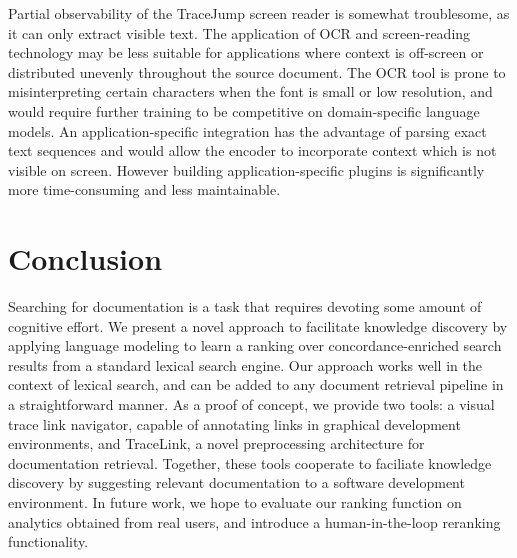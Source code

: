 \documentclass[sigconf,authordraft]{acmart}
\begin{document}
Partial observability of the TraceJump screen reader is somewhat troublesome, as it can only extract visible text. The application of OCR and screen-reading technology may be less suitable for applications where context is off-screen or distributed unevenly throughout the source document. The OCR tool is prone to misinterpreting certain characters when the font is small or low resolution, and would require further training to be competitive on domain-specific language models. An application-specific integration has the advantage of parsing exact text sequences and would allow the encoder to incorporate context which is not visible on screen. However building application-specific plugins is significantly more time-consuming and less maintainable.

\section{Conclusion}

Searching for documentation is a task that requires devoting some amount of cognitive effort. We present a novel approach to facilitate knowledge discovery by applying language modeling to learn a ranking over concordance-enriched search results from a standard lexical search engine. Our approach works well in the context of lexical search, and can be added to any document retrieval pipeline in a straightforward manner. As a proof of concept, we provide two tools: a visual trace link navigator, capable of annotating links in graphical development environments, and TraceLink, a novel preprocessing architecture for documentation retrieval. Together, these tools cooperate to faciliate knowledge discovery by suggesting relevant documentation to a software development environment. In future work, we hope to evaluate our ranking function on analytics obtained from real users, and introduce a human-in-the-loop reranking functionality.



\end{document}
